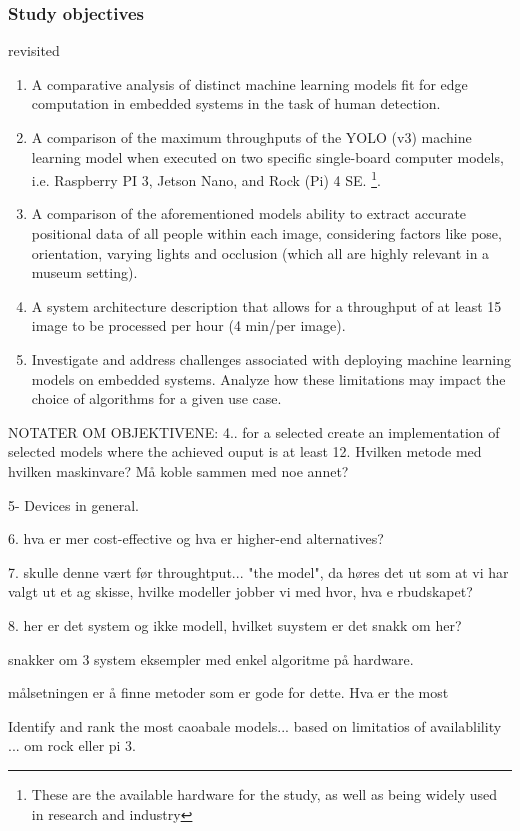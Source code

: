 \subsubsection*{Study objectives} revisited
\begin{enumerate}
    \item A comparative analysis of distinct machine learning models fit for edge computation in embedded systems in the task of human detection.
    \item A comparison of the maximum throughputs of the YOLO (v3) machine learning model when executed on two specific single-board computer models, i.e. Raspberry PI 3, Jetson Nano, and Rock (Pi) 4 SE. \footnote{These are the available hardware for the study, as well as being widely used in research and industry}.
    \item A comparison of the aforementioned models ability to extract accurate positional data of all people within each image, considering factors like pose, orientation, varying lights and occlusion (which all are highly relevant in a museum setting).
    \item A system architecture description that allows for a throughput of at least 15 image to be processed per hour (4 min/per image).
    \item Investigate and address challenges associated with deploying machine learning models on embedded systems. Analyze how these limitations may impact the choice of algorithms for a given use case.
\end{enumerate}

NOTATER OM OBJEKTIVENE:
4.. for a selected create an implementation of selected models where the achieved ouput is at least 12. Hvilken metode med hvilken maskinvare? Må koble sammen med noe annet?

5- Devices in general.

6. hva er mer cost-effective og hva er higher-end alternatives?

7. skulle denne vært før throughtput... 
"the model", da høres det ut som at vi har valgt ut et 
ag skisse, hvilke modeller jobber vi med hvor, hva e rbudskapet?

8. her er det system og ikke modell, hvilket suystem er det snakk om her? 

snakker om 3 system eksempler med enkel algoritme på hardware. 

målsetningen er å finne metoder som er gode for dette. Hva er the most 

Identify and rank the most caoabale models...
based on limitatios of availablility ... om rock eller pi 3. 

